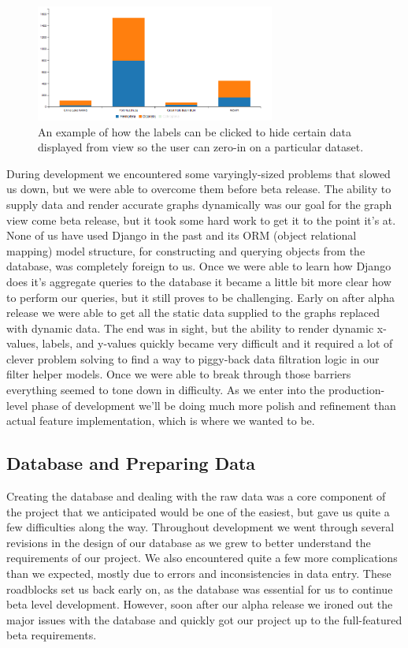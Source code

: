 \documentclass[10pt,draftclsnofoot,onecolumn]{IEEEtran}
\begin{document}
\begin{figure}[h]
\centering
\includegraphics[width=0.70\textwidth]{images/bar_chart_collapsed.png}
\captionsetup{justification=centering}
\caption{
  An example of how the labels can be clicked to hide certain data displayed from view so the user can zero-in on a particular dataset.
}
\label{fig:bar_chart_collapsed}
\end{figure}

During development we encountered some varyingly-sized problems that slowed us down, but we were able to overcome them before beta release.
The ability to supply data and render accurate graphs dynamically was our goal for the graph view come beta release, but it took some hard work to get it to the point it's at.
None of us have used Django in the past and its ORM (object relational mapping) model structure, for constructing and querying objects from the database, was completely foreign to us.
Once we were able to learn how Django does it’s aggregate queries to the database it became a little bit more clear how to perform our queries, but it still proves to be challenging.
Early on after alpha release we were able to get all the static data supplied to the graphs replaced with dynamic data.
The end was in sight, but the ability to render dynamic x-values, labels, and y-values quickly became very difficult and it required a lot of clever problem solving to find a way to piggy-back data filtration logic in our filter helper models.
Once we were able to break through those barriers everything seemed to tone down in difficulty.
As we enter into the production-level phase of development we'll be doing much more polish and refinement than actual feature implementation, which is where we wanted to be.

\subsection{Database and Preparing Data} %

Creating the database and dealing with the raw data was a core component of the project that we anticipated would be one of the easiest, but gave us quite a few difficulties along the way.
Throughout development we went through several revisions in the design of our database as we grew to better understand the requirements of our project.
We also encountered quite a few more complications than we expected, mostly due to errors and inconsistencies in data entry.
These roadblocks set us back early on, as the database was essential for us to continue beta level development.
However, soon after our alpha release we ironed out the major issues with the database and quickly got our project up to the full-featured beta requirements.
\end{document}
